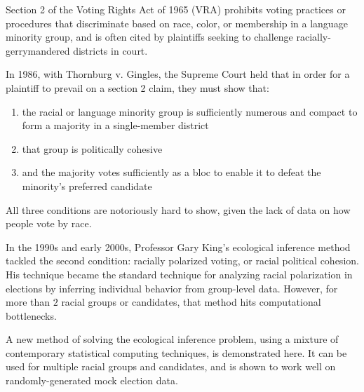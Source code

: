 
Section 2 of the Voting Rights Act of 1965 (VRA) \cite{vra} prohibits voting practices or procedures that discriminate based on race, color, or membership in a language minority group, and is often cited by plaintiffs seeking to challenge racially-gerrymandered districts in court.

In 1986, with Thornburg v. Gingles\cite{thornburg}, the Supreme Court held that in order for a plaintiff to prevail on a section 2 claim, they must show that:

\begin{enumerate}
  \item the racial or language minority group is sufficiently numerous and compact to form a majority in a single-member district
  \item that group is politically cohesive
  \item and the majority votes sufficiently as a bloc to enable it to defeat the minority’s preferred candidate
\end{enumerate}

All three conditions are notoriously hard to show, given the lack of data on how people vote by race.

In the 1990s and early 2000s, Professor Gary King’s ecological inference method tackled the second condition: racially polarized voting, or racial political cohesion. His technique became the standard technique for analyzing racial polarization in elections by inferring individual behavior from group-level data. However, for more than $2$ racial groups or candidates, that method hits computational bottlenecks.

A new method of solving the ecological inference problem, using a mixture of contemporary statistical computing techniques, is demonstrated here. It can be used for multiple racial groups and candidates, and is shown to work well on randomly-generated mock election data.
